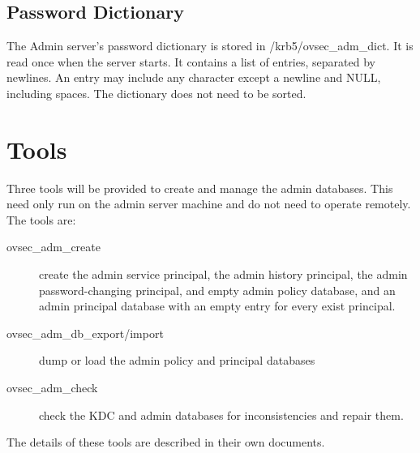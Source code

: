 \subsection{Password Dictionary}

The Admin server's password dictionary is stored in
/krb5/ovsec_adm_dict.  It is read once when the server starts.  It
contains a list of entries, separated by newlines.  An entry may
include any character except a newline and NULL, including spaces.
The dictionary does not need to be sorted.

\section{Tools}
\label{sec:tools}

Three tools will be provided to create and manage the admin databases.
This need only run on the admin server machine and do not need to
operate remotely.  The tools are:

\begin{description}
\item[ovsec_adm_create] create the admin service principal, the admin
history principal, the admin password-changing principal, and empty
admin policy database, and an admin principal database with an empty
entry for every exist principal.
\item[ovsec_adm_db_export/import] dump or load the admin policy and
principal databases
\item[ovsec_adm_check] check the KDC and admin databases for
inconsistencies and repair them.
\end{description}

The details of these tools are described in their own documents.


